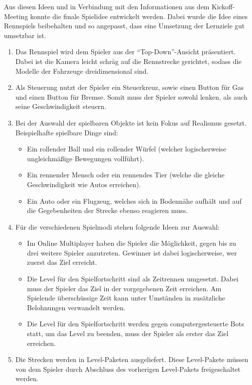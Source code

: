 	Aus diesen Ideen und in Verbindung mit den Informationen aus dem Kickoff-Meeting konnte die finale Spielidee entwickelt werden. Dabei wurde die Idee eines Rennspiels beibehalten und so angepasst, dass eine Umsetzung der Lernziele gut umsetzbar ist.
	\begin{enumerate}
		\item{Das Rennspiel wird dem Spieler aus der \enquote{Top-Down}-Ansicht präsentiert. Dabei ist die Kamera leicht schräg auf die Rennstrecke gerichtet, sodass die Modelle der Fahrzeuge dreidimensional sind.}
		\item{Als Steuerung nutzt der Spieler ein Steuerkreuz, sowie einen Button für Gas und einen Button für Bremse. Somit muss der Spieler sowohl lenken, als auch seine Geschwindigkeit steuern.}
		\item{Bei der Auswahl der spielbaren Objekte ist kein Fokus auf Realismus gesetzt. Beispielhafte spielbare Dinge sind:}
		\begin{itemize}
			\item{Ein rollender Ball und ein rollender Würfel (welcher logischerweise ungleichmäßige Bewegungen vollführt).}
			\item{Ein rennender Mensch oder ein rennendes Tier (welche die gleiche Geschwindigkeit wie Autos erreichen).}
			\item{Ein Auto oder ein Flugzeug, welches sich in Bodennähe aufhält und auf die Gegebenheiten der Strecke ebenso reagieren muss.}
		\end{itemize}
		\item{Für die verschiedenen Spielmodi stehen folgende Ideen zur Auswahl:}
		\begin{itemize}
			\item{Im Online Multiplayer haben die Spieler die Möglichkeit, gegen bis zu drei weitere Spieler anzutreten. Gewinner ist dabei logischerweise, wer zuerst das Ziel erreicht.}
			\item{Die Level für den Spielfortschritt sind als Zeitrennen umgesetzt. Dabei muss der Spieler das Ziel in der vorgegebenen Zeit erreichen. Am Spielende überschüssige Zeit kann unter Umständen in zusätzliche Belohnungen verwandelt werden.}
			\item{Die Level für den Spielfortschritt werden gegen computergesteuerte Bots statt, um das Level zu beenden, muss der Spieler als erster das Ziel erreichen.}
		\end{itemize}
		\item{Die Strecken werden in Level-Paketen ausgeliefert. Diese Level-Pakete müssen von dem Spieler durch Abschluss des vorherigen Level-Pakets freigeschaltet werden.}

\end{enumerate}
